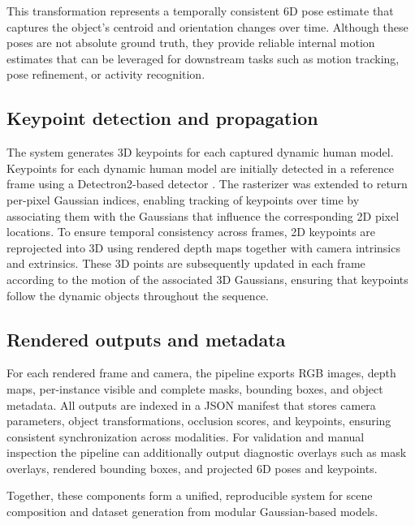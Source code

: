 This transformation represents a temporally consistent 6D pose estimate 
that captures the object’s centroid and orientation changes over time. 
Although these poses are not absolute ground truth, 
they provide reliable internal motion estimates that can be leveraged 
for downstream tasks such as motion tracking, pose refinement, or activity recognition.



\subsection{Keypoint detection and propagation}
The system generates 3D keypoints for each captured dynamic human model. Keypoints for each dynamic human model are initially detected in a reference frame using a Detectron2-based detector \cite{Detectron22020}. The rasterizer was extended to return per-pixel Gaussian indices, enabling tracking of keypoints over time by associating them with the Gaussians that influence the corresponding 2D pixel locations. To ensure temporal consistency across frames, 2D keypoints are reprojected into 3D using rendered depth maps together with camera intrinsics and extrinsics. These 3D points are subsequently updated in each frame according to the motion of the associated 3D Gaussians, ensuring that keypoints follow the dynamic objects throughout the sequence.

\subsection{Rendered outputs and metadata}
For each rendered frame and camera, the pipeline exports RGB images, depth maps, per-instance visible and complete masks, bounding boxes, and object metadata.
All outputs are indexed in a JSON manifest that stores camera parameters, object transformations, occlusion scores, and keypoints, ensuring consistent synchronization across modalities.
For validation and manual inspection the pipeline can additionally output diagnostic overlays such as mask overlays, rendered bounding boxes, and projected 6D poses and keypoints.

\smallskip
Together, these components form a unified, reproducible system for scene composition and dataset generation from modular Gaussian-based models.
